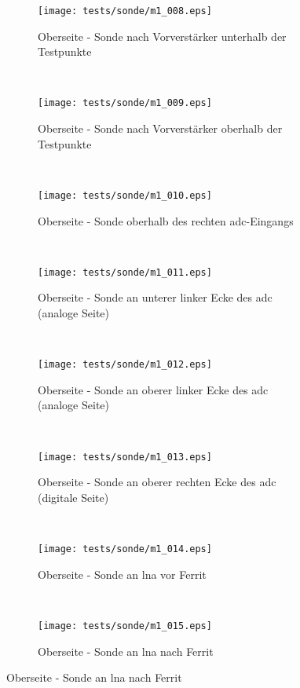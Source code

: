 \clearpage
\begin{figure}[h!]
\ContinuedFloat
        \centering
  \begin{subfigure}[t]{0.48\textwidth}
	\centering
  	\texttt{[image: tests/sonde/m1\_008.eps]}  
  	\caption{Oberseite - Sonde nach Vorverstärker unterhalb der Testpunkte}
  \label{fig:m2}
  \end{subfigure}
  ~
  \begin{subfigure}[t]{0.48\textwidth}
	\centering
  	\texttt{[image: tests/sonde/m1\_009.eps]}  
  	\caption{Oberseite - Sonde nach Vorverstärker oberhalb der Testpunkte}
  \label{fig:m2}
  \end{subfigure}
  ~
  \begin{subfigure}[t]{0.48\textwidth}
	\centering
  	\texttt{[image: tests/sonde/m1\_010.eps]}  
  	\caption{Oberseite - Sonde oberhalb des rechten \ac{adc}-Eingangs}
  \label{fig:m2}
  \end{subfigure}
  ~
  \begin{subfigure}[t]{0.48\textwidth}
	\centering
  	\texttt{[image: tests/sonde/m1\_011.eps]}  
  	\caption{Oberseite - Sonde an unterer linker Ecke des \ac{adc} (analoge Seite)}
  \label{fig:m2}
  \end{subfigure}
  ~
  \begin{subfigure}[t]{0.48\textwidth}
	\centering
  	\texttt{[image: tests/sonde/m1\_012.eps]}  
  	\caption{Oberseite - Sonde an oberer linker Ecke des \ac{adc} (analoge Seite)}
  \label{fig:m2}
  \end{subfigure}
  ~
  \begin{subfigure}[t]{0.48\textwidth}
	\centering
  	\texttt{[image: tests/sonde/m1\_013.eps]}  
  	\caption{Oberseite - Sonde an oberer rechten Ecke des \ac{adc} (digitale Seite)}
  \label{fig:m2}
  \end{subfigure}
  ~
  \begin{subfigure}[t]{0.48\textwidth}
	\centering
  	\texttt{[image: tests/sonde/m1\_014.eps]}  
  	\caption{Oberseite - Sonde an \ac{lna} vor Ferrit}
  \label{fig:m2}
  \end{subfigure}
  ~
  \begin{subfigure}[t]{0.48\textwidth}
	\centering
  	\texttt{[image: tests/sonde/m1\_015.eps]}  
  	\caption{Oberseite - Sonde an \ac{lna} nach Ferrit}
  \label{fig:m2}
  \end{subfigure}
\end{figure}
